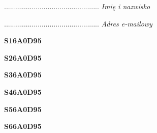 \begin{turn}{90}\begin{minipage}{\linewidth} \vspace{20mm} ................................................  \textit{Imię i nazwisko}\end{minipage}\end{turn}

\begin{turn}{90}\begin{minipage}{\linewidth} \vspace{20mm} ................................................  \textit{Adres e-mailowy}\end{minipage}\end{turn}

\begin{turn}{90}\huge \begin{minipage}{\linewidth} \vspace{10mm}\textbf{S16A0D95}\end{minipage}\end{turn}

\begin{turn}{90}\huge \begin{minipage}{\linewidth} \vspace{10mm}\textbf{S26A0D95}\end{minipage}\end{turn}

\begin{turn}{90}\huge \begin{minipage}{\linewidth} \vspace{10mm}\textbf{S36A0D95}\end{minipage}\end{turn}

\begin{turn}{90}\huge \begin{minipage}{\linewidth} \vspace{10mm}\textbf{S46A0D95}\end{minipage}\end{turn}

\begin{turn}{90}\huge \begin{minipage}{\linewidth} \vspace{10mm}\textbf{S56A0D95}\end{minipage}\end{turn}

\begin{turn}{90}\huge \begin{minipage}{\linewidth} \vspace{10mm}\textbf{S66A0D95}\end{minipage}\end{turn}

